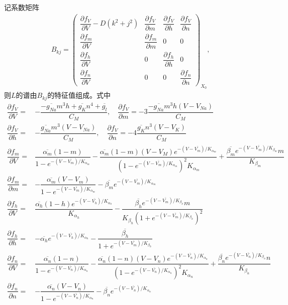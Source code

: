 \documentclass[
    bachelor,
    nofont, %
    pdflinks,
    ]{xjtuthesis}
\begin{document}
记系数矩阵
\begin{align*}
B _{kj} = \left(                
  \begin{array}{cccc}   
    \dfrac{\partial f_V}{\partial V}-D(k^2+j^2) & \dfrac{\partial f_V}{\partial m} & \dfrac{\partial f_V}{\partial h} & \dfrac{\partial f_V}{\partial n}\\  
    \dfrac{\partial f_m}{\partial V} & \dfrac{\partial f_m}{\partial m} & 0 & 0\\   
    \dfrac{\partial f_h}{\partial V} & 0  & \dfrac{\partial f_h}{\partial h} & 0 \\
    \dfrac{\partial f_n}{\partial V} & 0 & 0 & \dfrac{\partial f_n}{\partial n} 
  \end{array}
\right)_{X_0},
\end{align*}
则$L$的谱由$B _{kj}$的特征值组成。式中
\begin{align*}
\dfrac{\partial f_V}{\partial V} = & -\dfrac{-\overline{g_{Na}}m^3h+\overline{g_{K}}n^4+\overline{g_{l}}}{C_M}, \quad \dfrac{\partial f_V}{\partial m} = -3\dfrac{-\overline{g_{Na}}m^3h(V-V_{Na})}{C_M} \\
\dfrac{\partial f_V}{\partial h} = &- \dfrac{\overline{g_{Na}}m^3(V -V_{Na})}{C_M}, \quad \dfrac{\partial f_V}{\partial n}=-4 \dfrac{\overline{g_{K}}n^3(V-V_{K})}{C_M}\\
\dfrac{\partial f_m}{\partial V} = & \dfrac{\overline{\alpha_m}(1-m)}{1- e^{-(V-\overline{V_{m}})/K_{\alpha_m}}} - \dfrac{\overline{\alpha_m}(1-m)(V -V_{M})e^{-(V-\overline{V_{m}})/K_{\alpha_m}}}{(1- e^{-(V-\overline{V_{m}})/K_{\alpha_m}})^2 K_{\alpha_m}} + \dfrac{\overline{\beta_m}e^{-(V-\overline{V_{m}})/K_{\beta_m}}m}{K_{\beta_m}}\\
\dfrac{\partial f_m}{\partial m} = & -\dfrac{\overline{\alpha_m}(V -V_{m})}{1- e^{-(V-\overline{V_{m}})/K_{\alpha_m}}}-\overline{\beta_m}e^{-(V-\overline{V_{m}})/K_{\alpha_m}}\\
\dfrac{\partial f_h}{\partial V} = & \dfrac{\overline{\alpha_h}(1-h)e^{-(V-\overline{V_{h}})/K_{\alpha_h}}}{K_{\alpha_h}}-\dfrac{\overline{\beta_h}e^{-(V-\overline{V_{m}})/K_{\beta_h}}m}{K_{\beta_h}(1+e^{-(V-\overline{V_{m}})/K_{\beta_h}})^2}\\
\dfrac{\partial f_h}{\partial h} = & -\overline{\alpha_h}e^{-(V-\overline{V_{h}})/K_{\alpha_h}} - \dfrac{\overline{\beta_h}}{1+e^{-(V-\overline{V_{m}})/K_{\beta_h}}}\\
\dfrac{\partial f_n}{\partial V} = & \dfrac{\overline{\alpha_n}(1-n)}{1- e^{-(V-\overline{V_{n}})/K_{\alpha_n}}} - \dfrac{\overline{\alpha_n}(1-n)(V -V_{n})e^{-(V-\overline{V_{n}})/K_{\alpha_n}}}{(1- e^{-(V-\overline{V_{n}})/K_{\alpha_n}})^2 K_{\alpha_n}} + \dfrac{\overline{\beta_n}e^{-(V-\overline{V_{n}})/K_{\beta_n}}n}{K_{\beta_n}}\\
\dfrac{\partial f_n}{\partial n} = & -\dfrac{\overline{\alpha_n}(V -V_{n})}{1- e^{-(V-\overline{V_{n}})/K_{\alpha_n}}}-\overline{\beta_n}e^{-(V-\overline{V_{n}})/K_{\alpha_n}}
\end{align*}
\end{document}
